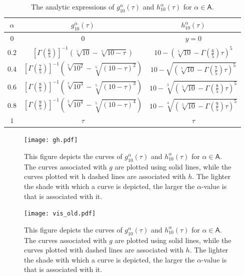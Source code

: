 \documentclass[twoside,reqno,11pt]{fcaa-var} %
\begin{document}
\begin{table}[h!]
 \centering
 \caption{The analytic expressions of $g_{10}^{\alpha}(\tau)$ and $h_{10}^{\alpha}(\tau)$ for $\alpha\in\mathsf{A}$.}
 \label{tab:gandh}
 \begin{tabular}{|c || c | c|} 
 \hline
 $\alpha$ & $g_{10}^{\alpha}(\tau)$ & $h_{10}^{\alpha}(\tau)$ \\ [0.5ex] 
 \hline\hline
 $0$ & 0 & $y=0$ \\ 
 $0.2$ & $[\Gamma\left (\frac{6}{5} \right )]^{-1}\left(\sqrt[5]{10}-\sqrt[5]{10-\tau}\right)$ & $10 - \left ( \sqrt[5]{10} -  \Gamma\left (\frac{6}{5} \right ) \tau \right )^5$  \\
 $0.4$ & $[\Gamma\left (\frac{7}{5} \right )]^{-1}\left(\sqrt[5]{10^2}-\sqrt[5]{(10-\tau)^2}\right)$ & $10 - \sqrt{\left ( \sqrt[5]{10} -  \Gamma\left (\frac{7}{5} \right ) \tau \right )^5}$ \\
 $0.6$ & $[\Gamma\left (\frac{8}{5} \right )]^{-1}\left(\sqrt[5]{10^3}-\sqrt[5]{(10-\tau)^3}\right)$ & $10 - \sqrt[3]{\left ( \sqrt[5]{10} -  \Gamma\left (\frac{8}{5} \right ) \tau \right )^5}$ \\
 $0.8$ & $[\Gamma\left (\frac{9}{5} \right )]^{-1}\left(\sqrt[5]{10^4}-\sqrt[5]{(10-\tau)^4}\right)$ & $10 - \sqrt[4]{\left ( \sqrt[5]{10} -  \Gamma\left (\frac{9}{5} \right ) \tau \right )^5}$ \\ [1ex] 
 $1$ & $\tau$ & $\tau$ \\ [1ex] 
 \hline
 \end{tabular}
 \end{table}

\begin{figure}[htb]
\centering
\texttt{[image: gh.pdf]}
\caption{This figure depicts the curves of $g_{10}^{\alpha}(\tau)$ and $h_{10}^{\alpha}(\tau)$ for $\alpha\in\mathsf{A}$. The curves associated with $g$ are plotted using 
solid lines, while the curves plotted wit h dashed lines are associated with $h$. The lighter the shade with which a curve is depicted, the larger the $\alpha$-value is that is associated with it.
}
\label{fig:gandh}
\end{figure}

\begin{figure}[htb]
\centering
\texttt{[image: vis\_old.pdf]}
\caption{This figure depicts the curves of $g_{10}^{\alpha}(\tau)$ and $h_{10}^{\alpha}(\tau)$ for $\alpha\in\mathsf{A}$. The curves associated with $g$ are plotted using 
solid lines, while the curves plotted with dashed lines are associated with $h$. The lighter the shade with which a curve is depicted, the larger the $\alpha$-value is that is associated with it.
}
\label{fig:gandh}
\end{figure}
\end{document}
